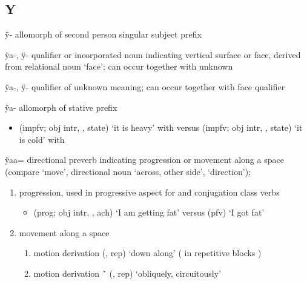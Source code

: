 \documentclass[12pt,letterpaper,oneside,article]{memoir}
\begin{document}
\subsection{Y}\label{sec:alphalist-y}
\begin{morphdesc}[resume*=alphalist]
\item[ÿ-]
	allomorph of  second person singular subject prefix
	
\item[ÿa-, ÿ-]
	qualifier or incorporated noun indicating vertical surface or face,
	derived from relational noun  ‘face’;
	can occur together with  unknown

\item[ÿa-, ÿ-]
	qualifier of unknown meaning;
	can occur together with  face qualifier

\item[ÿa-]
	allomorph of  stative prefix
	\begin{itemize}
	\item	{} (impfv; obj intr, ,  state) ‘it is heavy’
			with \newline
		versus  (impfv; obj intr, ,  state) ‘it is cold’
			with 
	\end{itemize}

\item[ÿaa=]
	directional preverb indicating progression or movement along a space
	(compare  ‘move’,
		directional noun  ‘across, other side’,
		 ‘direction’);
	\begin{enumerate}
	\item	progression, used in progressive aspect for  and  conjugation class verbs
		\begin{itemize}
		\item	{} (prog; obj intr, , ach) ‘I am getting fat’\newline
			versus  (pfv) ‘I got fat’
		\end{itemize}
	\item	movement along a space
		\begin{enumerate}
		\item	motion derivation
				 (,  rep) ‘down along’
				( in repetitive blocks )
		\item	motion derivation
				 \~\  (,  rep) ‘obliquely, circuitously’
		\end{enumerate}
	\end{enumerate}


\end{morphdesc}
\end{document}
